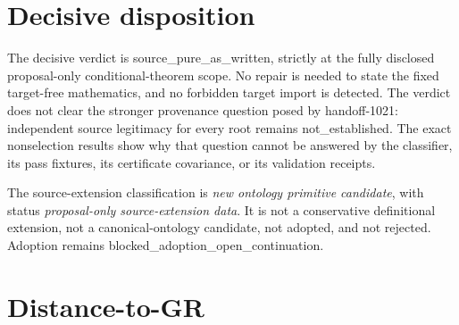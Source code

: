 \documentclass[11pt]{article}
\newcommand{\status}[1]{\textsf{#1}}
\begin{document}
\section{Decisive disposition}

The decisive verdict is \status{source\_pure\_as\_written}, strictly at the
fully disclosed proposal-only conditional-theorem scope.  No repair is needed
to state the fixed target-free mathematics, and no forbidden target import is
detected.  The verdict does not clear the stronger provenance question posed
by handoff-1021: independent source legitimacy for every root remains
\status{not\_established}.  The exact nonselection results show why that
question cannot be answered by the classifier, its pass fixtures, its
certificate covariance, or its validation receipts.

The source-extension classification is \emph{new ontology primitive
candidate}, with status \emph{proposal-only source-extension data}.  It is not
a conservative definitional extension, not a canonical-ontology candidate,
not adopted, and not rejected.  Adoption remains
\status{blocked\_adoption\_open\_continuation}.

\section{Distance-to-GR}
\end{document}
